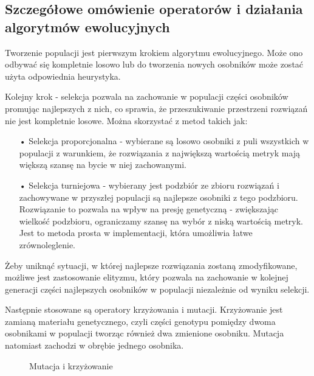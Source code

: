 \subsection{Szczegółowe omówienie operatorów i działania algorytmów ewolucyjnych}
Tworzenie populacji jest pierwszym krokiem algorytmu ewolucyjnego. Może ono odbywać się kompletnie losowo lub do tworzenia nowych osobników może zostać użyta odpowiednia heurystyka. 

Kolejny krok - selekcja pozwala na zachowanie w populacji części osobników promując najlepszych z nich, co sprawia, że przeszukiwanie przestrzeni rozwiązań nie jest kompletnie losowe. Można skorzystać z metod takich jak:
\begin{itemize}
  \item[•] Selekcja proporcjonalna - wybierane są losowo osobniki z puli wszystkich w populacji z warunkiem, że rozwiązania z największą wartością metryk mają większą szansę na bycie w niej zachowanymi. 
  \item[•] Selekcja turniejowa - wybierany jest podzbiór ze zbioru rozwiązań i zachowywane w przyszłej populacji są najlepsze osobniki z tego podzbioru. Rozwiązanie to pozwala na wpływ na presję genetyczną - zwiększając wielkość podzbioru, ograniczamy szansę na wybór z niską wartością metryk. Jest to metoda prosta w implementacji, która umożliwia łatwe zrównoleglenie.
\end{itemize}

Żeby uniknąć sytuacji, w której najlepsze rozwiązania zostaną zmodyfikowane, możliwe jest zastosowanie elityzmu, który pozwala na zachowanie w kolejnej generacji części najlepszych osobników w populacji niezależnie od wyniku selekcji.

Następnie stosowane są operatory krzyżowania i mutacji. Krzyżowanie jest zamianą materiału genetycznego, czyli części genotypu pomiędzy dwoma osobnikami w populacji tworząc również dwa zmienione osobniku. Mutacja natomiast zachodzi w obrębie jednego osobnika.

\begin{figure}[h]
	\caption{\label{fig:mutation-and-crossover-operations}Mutacja i krzyżowanie}
\end{figure}

